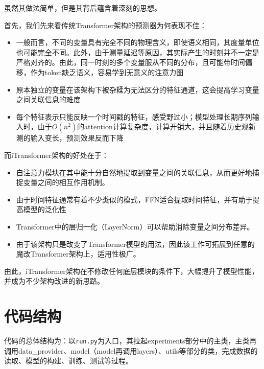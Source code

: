 \documentclass[twoside,12pt]{article}
\begin{document}
虽然其做法简单，但是其背后蕴含着深刻的思想。

首先，我们先来看传统Transformer架构的预测器为何表现不佳：
\begin{itemize}
  \item 一般而言，不同的变量具有完全不同的物理含义，即使语义相同，其度量单位也可能完全不同。此外，由于测量延迟等原因，其实际产生的时刻并不一定是严格对齐的。由此，同一时刻的多个变量服从不同的分布，且可能带时间偏移，作为token缺乏语义，容易学到无意义的注意力图
  \item 原本独立的变量在该架构下被杂糅为无法区分的特征通道，这会提高学习变量之间关联信息的难度
  \item 每个特征表示只能反映一个时间戳的特征，感受野过小；模型处理长期序列输入时，由于$O(n^2)$的attention计算复杂度，计算开销大，并且随着历史观新测的输入变长，预测效果反而下降
\end{itemize}

而iTransformer架构的好处在于：
\begin{itemize}
  \item 自注意力模块在其中能十分自然地提取到变量之间的关联信息，从而更好地捕捉变量之间的相互作用机制。
  \item 由于时间特征通常有着不少类似的模式，FFN适合提取时间特征，并有助于提高模型的泛化性
  \item Transformer中的层归一化（LayerNorm）可以帮助消除变量之间分布差异。
  \item 由于该架构只是改变了Transformer模型的用法，因此该工作可拓展到任意的魔改Transformer架构上，适用性极广。
\end{itemize}

由此，iTransformer架构在不修改任何底层模块的条件下，大幅提升了模型性能，并成为不少架构改进的新思路。

\section{代码结构}

代码的总体结构为：以\verb |run.py|为入口，其拉起experiments部分中的主类，主类再调用data\_provider、model（model再调用layers）、utils等部分的类，完成数据的读取、模型的构建、训练、测试等过程。
\end{document}
